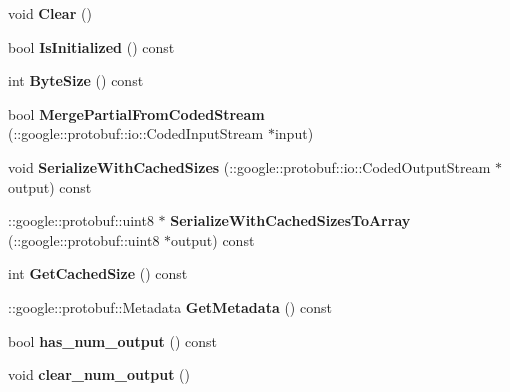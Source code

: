 \begin{DoxyCompactItemize}
void {\bfseries Clear} ()
\item 
\mbox{\label{classcaffe_1_1_embed_parameter_af8c0e2e2d9426fc8016afdc451f46cd0}} 
bool {\bfseries Is\+Initialized} () const
\item 
\mbox{\label{classcaffe_1_1_embed_parameter_affc8c08f3bf7c222aa19ef32130bef44}} 
int {\bfseries Byte\+Size} () const
\item 
\mbox{\label{classcaffe_1_1_embed_parameter_aff3e171a5284b7438960652b31859ac7}} 
bool {\bfseries Merge\+Partial\+From\+Coded\+Stream} (\+::google\+::protobuf\+::io\+::\+Coded\+Input\+Stream $\ast$input)
\item 
\mbox{\label{classcaffe_1_1_embed_parameter_a7947b4f468e5e2f16c562da750810353}} 
void {\bfseries Serialize\+With\+Cached\+Sizes} (\+::google\+::protobuf\+::io\+::\+Coded\+Output\+Stream $\ast$output) const
\item 
\mbox{\label{classcaffe_1_1_embed_parameter_a4f4e19d5b868f1d07544c2a2937c0b0e}} 
\+::google\+::protobuf\+::uint8 $\ast$ {\bfseries Serialize\+With\+Cached\+Sizes\+To\+Array} (\+::google\+::protobuf\+::uint8 $\ast$output) const
\item 
\mbox{\label{classcaffe_1_1_embed_parameter_ab3edcf5db1f87b472bdef13079c92d4b}} 
int {\bfseries Get\+Cached\+Size} () const
\item 
\mbox{\label{classcaffe_1_1_embed_parameter_a89f7c0b6deb66e0c509e2a3ec80c0811}} 
\+::google\+::protobuf\+::\+Metadata {\bfseries Get\+Metadata} () const
\item 
\mbox{\label{classcaffe_1_1_embed_parameter_a3478cd7f7819750c70c20d49c4418bc6}} 
bool {\bfseries has\+\_\+num\+\_\+output} () const
\item 
\mbox{\label{classcaffe_1_1_embed_parameter_a080d77abd7e17a87df5dd2ca44029797}} 
void {\bfseries clear\+\_\+num\+\_\+output} ()
\item 

\end{DoxyCompactItemize}

